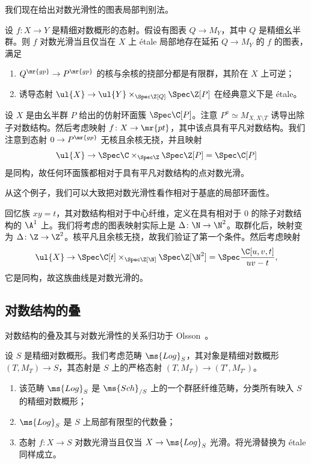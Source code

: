 我们现在给出对数光滑性的图表局部判别法。

\begin{thm}
    设 \(f \colon X \to Y\) 是精细对数概形的态射。假设有图表 \(Q \to M_Y\)，其中 \(Q\) 是精细幺半群。则 \(f\) 对数光滑当且仅当在 \(X\) 上 \'etale 局部地存在延拓 \(Q \to M_Y\) 的 \(f\) 的图表，满足
    \begin{enumerate}
        \item \(Q^{\mr{gp}} \to P^{\mr{gp}}\) 的核与余核的挠部分都是有限群，其阶在 \(X\) 上可逆；
        \item 诱导态射 \(\ul{X} \to \ul{Y} \times_{\Spec \Z[Q]} \Spec \Z[P]\) 在经典意义下是 \'etale。
    \end{enumerate}
\end{thm}

\begin{exm}
    设 \(X\) 是由幺半群 \(P\) 给出的仿射环面簇 \(\Spec \C[P]\)。注意 \(P^a \simeq M_{X, X \setminus T}\) 诱导出除子对数结构。然后考虑映射 \(f \colon X \to \mr{pt}\)，其中该点具有平凡对数结构。我们注意到态射 \(0 \to P^{\mr{gp}}\) 无核且余核无挠，并且映射
    \[ \ul{X} \to \Spec \C \times_{\Spec \Z} \Spec \Z[P] = \Spec \C[P] \]
    是同构，故任何环面簇都相对于具有平凡对数结构的点对数光滑。
\end{exm}

从这个例子，我们可以大致把对数光滑性看作相对于基底的局部环面性。

\begin{exm}
    回忆族 \(xy = t\)，其对数结构相对于中心纤维，定义在具有相对于 \(0\) 的除子对数结构的 \(\A^1\) 上。我们将考虑的图表映射实际上是 \(\Delta \colon \N \to \N^2\)。取群化后，映射变为 \(\Delta \colon \Z \to \Z^2\)。核平凡且余核无挠，故我们验证了第一个条件。然后考虑映射
    \[ \ul{X} \to \Spec \C[t] \times_{\Spec \Z[\N]} \Spec \Z[\N^2] = \Spec \frac{\C[u,v,t]}{uv-t}, \]
    它是同构，故这族曲线是对数光滑的。
\end{exm}

\subsection{对数结构的叠}%
\label{sub:Stack of log structures}

对数结构的叠及其与对数光滑性的关系归功于 Olsson~\cite{Olsson2003}。

设 \(S\) 是精细对数概形。我们考虑范畴 \(\ms{Log}_S\)，其对象是精细对数概形 \((T, M_T) \to S\)，其态射是 \(S\) 上的严格态射 \((T, M_T) \to (T', M_{T'})\)。
\begin{enumerate}
    \item 该范畴 \(\ms{Log}_S\) 是 \(\ms{Sch}_{/S}\) 上的一个群胚纤维范畴，分类所有映入 \(S\) 的精细对数概形；
    \item \(\ms{Log}_S\) 是 \(S\) 上局部有限型的代数叠；
    \item 态射 \(f \colon X \to S\) 对数光滑当且仅当 \(X \to \ms{Log}_S\) 光滑。将光滑替换为 \'etale 同样成立。
\end{enumerate}


